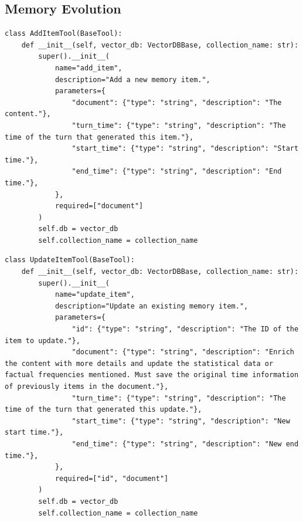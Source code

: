 \documentclass[11pt, a4paper]{lumia}
\begin{document}
\subsection{Memory Evolution}
\begin{tcolorbox}[title={AddItemTool}, sharp corners, breakable, 
      colframe=Periwinkle, colback=white, 
        boxrule=3pt, boxsep=0.5pt, enhanced, 
        shadow={3pt}{-3pt}{0pt}{opacity=1}]
        \footnotesize
        {\selectfont
\begin{lstlisting}[breaklines=true,showstringspaces=false]
class AddItemTool(BaseTool):
    def __init__(self, vector_db: VectorDBBase, collection_name: str):
        super().__init__(
            name="add_item",
            description="Add a new memory item.",
            parameters={
                "document": {"type": "string", "description": "The content."},
                "turn_time": {"type": "string", "description": "The time of the turn that generated this item."},
                "start_time": {"type": "string", "description": "Start time."},
                "end_time": {"type": "string", "description": "End time."},
            },
            required=["document"]
        )
        self.db = vector_db
        self.collection_name = collection_name
\end{lstlisting}
}
\end{tcolorbox}

\begin{tcolorbox}[title={UpdateItemTool}, sharp corners, breakable, 
      colframe=Periwinkle, colback=white, 
        boxrule=3pt, boxsep=0.5pt, enhanced, 
        shadow={3pt}{-3pt}{0pt}{opacity=1}]
        \footnotesize
        {\selectfont
\begin{lstlisting}[breaklines=true,showstringspaces=false]
class UpdateItemTool(BaseTool):
    def __init__(self, vector_db: VectorDBBase, collection_name: str):
        super().__init__(
            name="update_item",
            description="Update an existing memory item.",
            parameters={
                "id": {"type": "string", "description": "The ID of the item to update."},
                "document": {"type": "string", "description": "Enrich the content with more details and update the statistical data or factual frequencies mentioned. Must save the original time information of previously items in the document."},
                "turn_time": {"type": "string", "description": "The time of the turn that generated this update."},
                "start_time": {"type": "string", "description": "New start time."},
                "end_time": {"type": "string", "description": "New end time."},
            },
            required=["id", "document"]
        )
        self.db = vector_db
        self.collection_name = collection_name
\end{lstlisting}
}
\end{tcolorbox}
\end{document}
